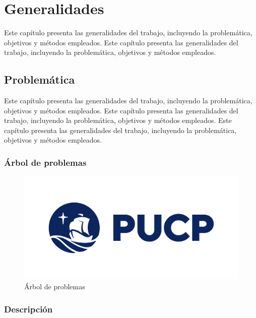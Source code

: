 \chapter{Generalidades}\label{c:Generalidades} %
Este capítulo presenta las generalidades del trabajo, incluyendo la problemática, objetivos y métodos empleados. Este capítulo presenta las generalidades del trabajo, incluyendo la problemática, objetivos y métodos empleados. 

\section{Problemática}
Este capítulo presenta las generalidades del trabajo, incluyendo la problemática, objetivos y métodos empleados. Este capítulo presenta las generalidades del trabajo, incluyendo la problemática, objetivos y métodos empleados. Este capítulo presenta las generalidades del trabajo, incluyendo la problemática, objetivos y métodos empleados.

\subsection{Árbol de problemas}

\begin{figure}[htbp]
    \centering
    \includegraphics[width=1\textwidth]{Images/logo_pucp.png} %
    \caption{Árbol de problemas} %
    \label{fig:arbol_problemas} %
\end{figure}

\subsection{Descripción}

